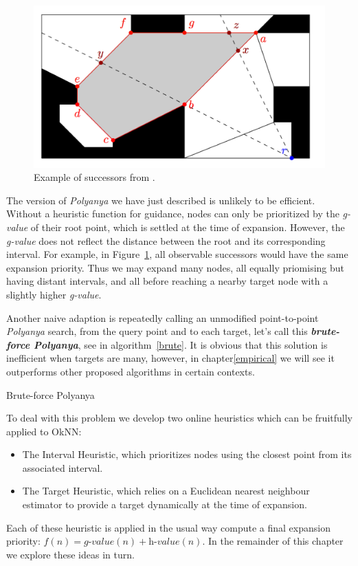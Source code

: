 \begin{figure}[ht]
    \centering
    \includegraphics[width=.6\linewidth]{pic/suc.png}
    \caption{\small Example of successors from \cite{cuicompromise}.}
    \label{suc2}
\end{figure}

The version of \textit{Polyanya} we have just described is unlikely to be efficient. Without a
heuristic function for guidance, nodes can only be prioritized by the \textit{g-value} of their
root point, which is settled at the time of expansion. However, the \textit{g-value} does not
reflect the distance between the root and its corresponding interval. For example, in
Figure~\ref{suc2}, all observable successors would have the same expansion priority. Thus we
may expand many nodes, all equally priomising but having distant intervals, and all before
reaching a nearby target node with a slightly higher \textit{g-value}.

Another naive adaption is repeatedly calling an unmodified point-to-point \textit{Polyanya}
search, from the query point and to each target, let's call this \textbf{\textit{brute-force
Polyanya}}, see in algorithm~\ref{brute}. It is obvious that this solution is
inefficient when targets are many, however, in chapter\ref{empirical} we will see it
outperforms other proposed algorithms in certain contexts. 
\begin{algorithm}[!htp]
  
  \caption{Brute-force Polyanya}
  \label{brute}
\end{algorithm}
To deal with this problem we develop two online heuristics which can be fruitfully applied to OkNN:
\begin{itemize}
  \item The Interval Heuristic, which prioritizes nodes using the closest point from its
    associated interval.
  \item The Target Heuristic, which relies on a Euclidean nearest neighbour estimator to
    provide a target dynamically at the time of expansion.
\end{itemize}
Each of these heuristic is applied in the usual way compute a final expansion priority: 
$f(n) = \textit{g-value}(n) + \textit{h-value}(n)$. In the remainder of this chapter we explore
these ideas in turn.

